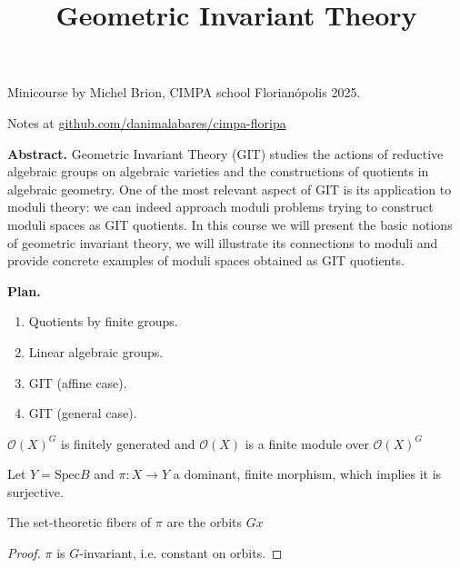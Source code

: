 


\title{Geometric Invariant Theory}
\maketitle

Minicourse by Michel Brion, CIMPA school Florianópolis 2025.

Notes at 
\href{http://github.com/danimalabares/cimpa-floripa}
{github.com/danimalabares/cimpa-floripa}

\bigskip\noindent

{\bf Abstract.} Geometric Invariant Theory (GIT) studies the actions of
reductive algebraic groups on algebraic varieties and the constructions of
quotients in algebraic geometry. One of the most relevant aspect of GIT is its
application to moduli theory: we can indeed approach moduli problems trying to
construct moduli spaces as GIT quotients. In this course we will present the
basic notions of geometric invariant theory, we will illustrate its connections
to moduli and provide concrete examples of moduli spaces obtained as GIT
quotients. 

\bigskip\noindent
\tableofcontents
\bigskip\noindent

{\bf Plan.}

\begin{enumerate}
\item Quotients by finite groups.
\item Linear algebraic groups.
\item GIT (affine case).
\item GIT (general case).
\end{enumerate}

\begin{proposition}
\label{proposition-1}
$\mathcal{O}(X)^G$ is finitely generated and $\mathcal{O}(X)$ is a finite module
over $\mathcal{O}(X)^G$
\end{proposition}

Let $Y = \text{Spec}B$ and $\pi:X\to Y$ a dominant, finite morphism, which
implies it is surjective.

\begin{proposition}
\label{proposition-2}
The set-theoretic fibers of $\pi$ are the orbits $Gx$
\end{proposition}

\begin{proof}
$\pi$ is $G$-invariant, i.e. constant on orbits.
\end{proof}

